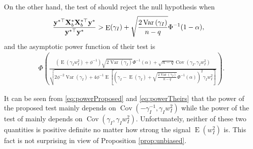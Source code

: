 \documentclass[11pt]{article}
\DeclareMathOperator{\myE}{E}
\DeclareMathOperator{\myVar}{Var}
\DeclareMathOperator{\myCov}{Cov}
\newcommand{\By}{\mathbf{y}}    \newcommand{\Bz}{\mathbf{z}}
\theoremstyle{plain}
\theoremstyle{definition}
\theoremstyle{remark}
\begin{document}
On the other hand, the test of \cite{Goeman2006} should reject the null hypothesis when
\begin{equation*}
        \frac{
            \By^{*\top} \BX_b^* \BX_b^{*\top} \By^*
        }{
            \By^{*\top} \By^*
        } 
        >
        \myE (\gamma_I)
        +\sqrt{
            \frac{2\myVar\left( \gamma_I \right)}{n-q} 
        }
        \Phi^{-1}(1-\alpha),
\end{equation*}
and the asymptotic power function of their test is
\begin{equation}\label{eq:powerTheirs}
    \begin{split}
    &\Phi\left( 
        \frac{
            \left( \myE (\gamma_I w_I^2) + \phi^{-1} \right)
            \sqrt{2\myVar\left( \gamma_I \right)} 
            \Phi^{-1}(\alpha)
            +
            \sqrt{n-q}
            \myCov\left( \gamma_I, \gamma_I w_I^2 \right)
        }{
            \sqrt{
                2\phi^{-2} \myVar ( \gamma_I ) 
                +
                4\phi^{-1}
    \myE\left[ 
        \left( \gamma_I -\myE(\gamma_I) +\sqrt{\frac{2\myVar (\gamma_I)}{n-q}} \Phi^{-1}(\alpha) \right)^2
        \gamma_I w_I^2
    \right]
            }
        } 
    \right).
    \end{split}
\end{equation}

It can be seen from \eqref{eq:powerProposed} and \eqref{eq:powerTheirs} that the power of the proposed test mainly depends on $\myCov (-\gamma_I^{-1}, \gamma_I w_I^2)$ while the power of the test of \cite{Goeman2006} mainly depends on $\myCov(\gamma_I, \gamma_I w_I^2)$.  
Unfortunately, neither of these two quantities is positive definite no matter how strong the signal $\myE (w_I^2)$ is.
This fact is not surprising in view of Proposition \ref{prop:unbiased}.
\end{document}
